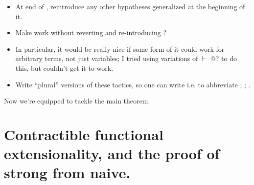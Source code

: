 \documentclass[12pt]{report}
\begin{document}
\begin{itemize}
\item  At end of , reintroduce any other hypotheses generalized at the beginning of it.

\item  Make  work without reverting and re-introducing ?  

\item  In particular, it would be really nice if some form of it could work for arbitrary terms, not just variables; I tried using variations of    \ensuremath{\vdash} @?  to do this, but couldn’t get it to work.

\item  Write “plural” versions of these tactics, so one can write i.e.     to abbreviate  ;  ;  .

\end{itemize}
\begin{coqdoccode}
\coqdocemptyline
\end{coqdoccode}
Now we’re equipped to tackle the main theorem. \begin{coqdoccode}
\coqdocemptyline
\end{coqdoccode}
\section{Contractible functional extensionality, and the proof of strong from naive.}
\end{document}
